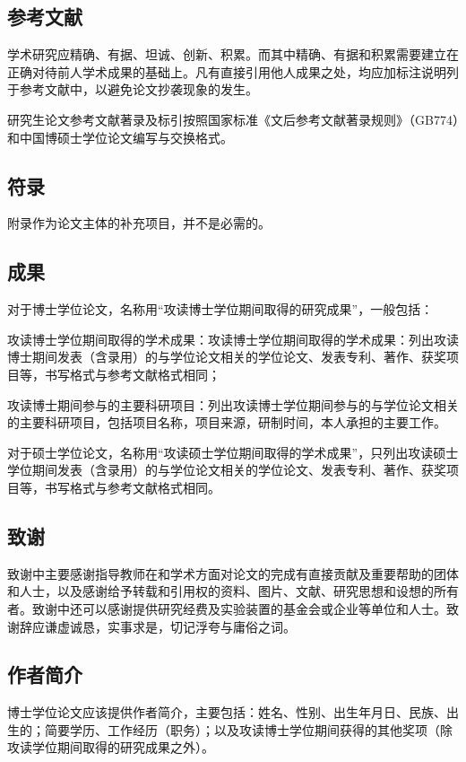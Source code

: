 \subsection{参考文献}

学术研究应精确、有据、坦诚、创新、积累。而其中精确、有据和积累需要建立在正确对待前人学术成果的基础上。凡有直接引用他人成果之处，均应加标注说明列于参考文献中，以避免论文抄袭现象的发生。

研究生论文参考文献著录及标引按照国家标准《文后参考文献著录规则》（GB774）和中国博硕士学位论文编写与交换格式。

\subsection{符录}

附录作为论文主体的补充项目，并不是必需的。

\subsection{成果}

对于博士学位论文，名称用“攻读博士学位期间取得的研究成果”，一般包括：

攻读博士学位期间取得的学术成果：攻读博士学位期间取得的学术成果：列出攻读博士期间发表（含录用）的与学位论文相关的学位论文、发表专利、著作、获奖项目等，书写格式与参考文献格式相同；

攻读博士期间参与的主要科研项目：列出攻读博士学位期间参与的与学位论文相关的主要科研项目，包括项目名称，项目来源，研制时间，本人承担的主要工作。

对于硕士学位论文，名称用“攻读硕士学位期间取得的学术成果”，只列出攻读硕士学位期间发表（含录用）的与学位论文相关的学位论文、发表专利、著作、获奖项目等，书写格式与参考文献格式相同。

\subsection{致谢}
致谢中主要感谢指导教师在和学术方面对论文的完成有直接贡献及重要帮助的团体和人士，以及感谢给予转载和引用权的资料、图片、文献、研究思想和设想的所有者。致谢中还可以感谢提供研究经费及实验装置的基金会或企业等单位和人士。致谢辞应谦虚诚恳，实事求是，切记浮夸与庸俗之词。

\subsection{作者简介}

博士学位论文应该提供作者简介，主要包括：姓名、性别、出生年月日、民族、出生的；简要学历、工作经历（职务）；以及攻读博士学位期间获得的其他奖项（除攻读学位期间取得的研究成果之外）。
